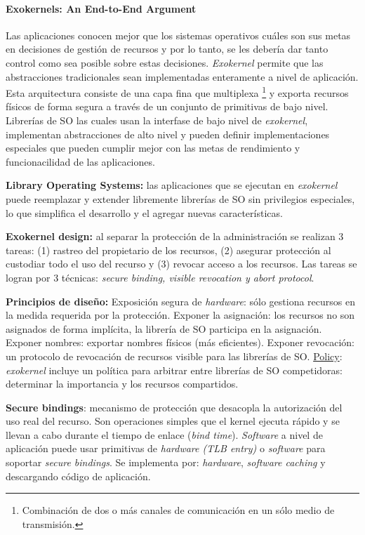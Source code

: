 \paragraph{\textnormal{\textbf{Exokernels: An End-to-End Argument}}}
Las aplicaciones conocen mejor que los sistemas operativos cuáles son sus metas en decisiones de gestión de recursos y por lo tanto, se les debería dar tanto control como sea posible sobre estas decisiones. \textit{Exokernel} permite que las abstracciones tradicionales sean implementadas enteramente a nivel de aplicación. Esta arquitectura consiste de una capa fina que multiplexa  \footnote{Combinación de dos o más canales de comunicación en un sólo medio de transmisión.} y exporta recursos físicos de forma segura a través de un conjunto de primitivas de bajo nivel. Librerías de SO las cuales usan la interfase de bajo nivel de \textit{exokernel}, implementan abstracciones de alto nivel y pueden definir implementaciones especiales que pueden cumplir mejor con las metas de rendimiento y funcionacilidad de las aplicaciones. 

\textbf{Library Operating Systems:} las aplicaciones que se ejecutan en \textit{exokernel} puede reemplazar y extender libremente librerías de SO sin privilegios especiales, lo que simplifica el desarrollo y el agregar nuevas características. 

\textbf{Exokernel design:} al separar la protección de la administración se realizan 3 tareas: (1) rastreo del propietario de los recursos, (2) asegurar protección al custodiar todo el uso del recurso y (3) revocar acceso a los recursos. Las tareas se logran por 3 técnicas: \textit{secure binding, visible revocation \textnormal{y} abort protocol}. 

\textbf{Principios de diseño:} Exposición segura de \textit{hardware}: sólo gestiona recursos en la medida requerida por la protección. Exponer la asignación: los recursos no son asignados de forma implícita, la librería de SO participa en la asignación. Exponer nombres: exportar nombres físicos (más eficientes). Exponer revocación: un protocolo de revocación de recursos visible para las librerías de SO. \underline{Policy}: \textit{exokernel} incluye un política para arbitrar entre librerías de SO competidoras: determinar la importancia y los recursos compartidos. 

\textbf{Secure bindings}: mecanismo de protección que desacopla la autorización del uso real del recurso. Son operaciones simples que el kernel ejecuta rápido y se llevan a cabo durante el tiempo de enlace (\textit{bind time}). \textit{Software} a nivel de aplicación puede usar primitivas de \textit{hardware (TLB entry)} o \textit{software} para soportar \textit{secure bindings}. Se implementa por: \textit{hardware}, \textit{software caching} y descargando código de aplicación. 

